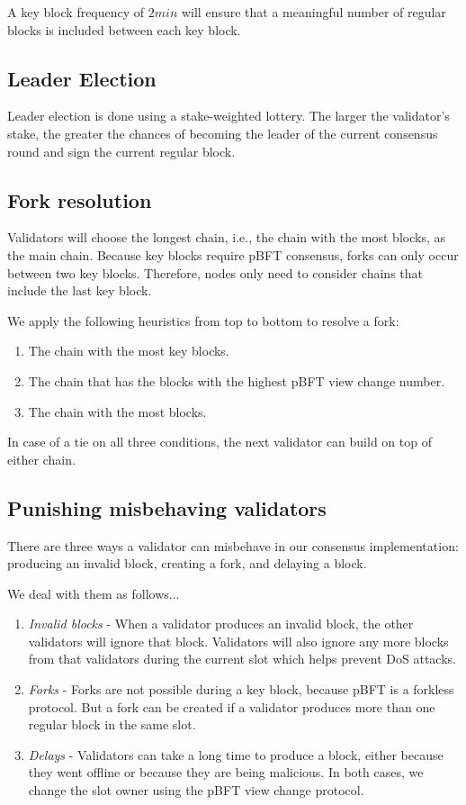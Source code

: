\documentclass[8pt,fleqn,openany]{book}
\begin{document}
A key block frequency of $2min$ will ensure that a meaningful number of regular blocks is included between each key block.

\subsection{Leader Election}
Leader election is done using a stake-weighted lottery. The larger the validator’s stake, the greater the chances of becoming the leader of the current consensus round and sign the current regular block.

\subsection{Fork resolution}
Validators will choose the longest chain, i.e., the chain with the most blocks, as the main chain. Because key blocks require pBFT consensus, forks can only occur between two key blocks. Therefore, nodes only need to consider chains that include the last key block.

We apply the following heuristics from top to bottom to resolve a fork:

\begin{enumerate}
	\item The chain with the most key blocks.
	\item The chain that has the blocks with the highest pBFT view change number.
	\item The chain with the most blocks.
\end{enumerate}

In case of a tie on all three conditions, the next validator can build on top of either chain.

\subsection{Punishing misbehaving validators}
There are three ways a validator can misbehave in our consensus implementation: producing an invalid block, creating a fork, and delaying a block.

We deal with them as follows...

\begin{enumerate}
	\item {\em Invalid blocks} - When a validator produces an invalid block, the other validators will ignore that block. Validators will also ignore any more blocks from that validators during the current slot which helps prevent DoS attacks.
	\item {\em Forks} - Forks are not possible during a key block, because pBFT is a forkless protocol. But a fork can be created if a validator produces more than one regular block in the same slot. 
	\item {\em Delays} - Validators can take a long time to produce a block, either because they went offline or because they are being malicious. In both cases, we change the slot owner using the pBFT view change protocol. 
\end{enumerate}
\end{document}
